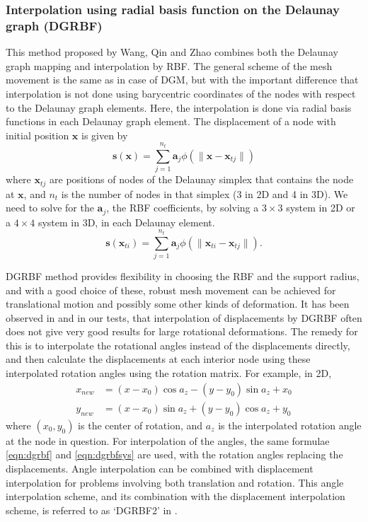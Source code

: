\documentclass[11pt, ms, onehalfspacing]{ncsuthesis}
\let\bld\boldsymbol
\begin{document}
\subsubsection[DG-RBF]{Interpolation using radial basis function on the Delaunay graph (DGRBF)}
This method proposed by Wang, Qin and Zhao \cite{mm:dgrbf} combines both the Delaunay graph mapping and interpolation by RBF. The general scheme of the mesh movement is the same as in case of DGM, but with the important difference that interpolation is not done using barycentric coordinates of the nodes with respect to the Delaunay graph elements. Here, the interpolation is done via radial basis functions in each Delaunay graph element. The displacement of a node with initial position $\bld{x}$ is given by
\begin{equation}
\mathbf{s}(\mathbf{x}) = \sum_{j=1}^{n_t} \mathbf{a}_j \phi(\lVert\mathbf{x} - \mathbf{x}_{tj}\rVert)
\label{eqn:dgrbf}
\end{equation}
where $\bld{x}_{tj}$ are positions of nodes of the Delaunay simplex that contains the node at $\bld{x}$, and $n_t$ is the number of nodes in that simplex (3 in 2D and 4 in 3D). We need to solve for the $\bld{a}_j$, the RBF coefficients, by solving a $3 \times 3$ system in 2D or a $4 \times 4$ system in 3D, in each Delaunay element.
\begin{equation}
\mathbf{s}(\mathbf{x}_{ti}) = \sum_{j=1}^{n_t} \mathbf{a}_j \phi(\lVert\mathbf{x}_{ti} - \mathbf{x}_{tj}\rVert).
\label{eqn:dgrbfsys}
\end{equation}

DGRBF method provides flexibility in choosing the RBF and the support radius, and with a good choice of these, robust mesh movement can be achieved for translational motion and possibly some other kinds of deformation. It has been observed in \cite{mm:dgrbf} and in our tests, that interpolation of displacements by DGRBF often does not give very good results for large rotational deformations. The remedy for this is to interpolate the rotational angles instead of the displacements directly, and then calculate the displacements at each interior node using these interpolated rotation angles using the rotation matrix. For example, in 2D,
\begin{align}
x_{new} &= (x-x_0)\cos a_z - (y-y_0)\sin a_z + x_0 \\
y_{new} &= (x-x_0)\sin a_z + (y-y_0)\cos a_z + y_0
\end{align}
where $(x_0,y_0)$ is the center of rotation, and $a_z$ is the interpolated rotation angle at the node in question. For interpolation of the angles, the same formulae \eqref{eqn:dgrbf} and \eqref{eqn:dgrbfsys} are used, with the rotation angles replacing the displacements. Angle interpolation can be combined with displacement interpolation for problems involving both translation and rotation. This angle interpolation scheme, and its combination with the displacement interpolation scheme, is referred to as `DGRBF2' in \cite{mm:dgrbf}.
\end{document}
